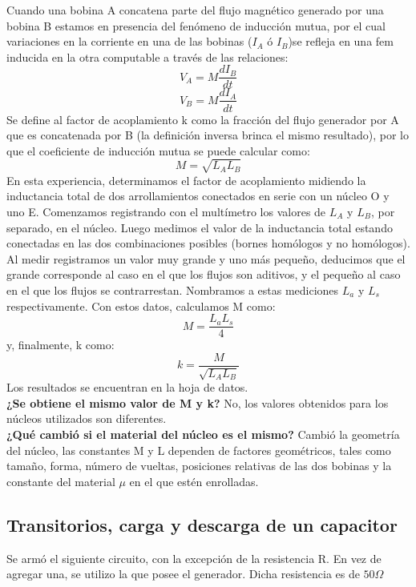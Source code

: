 \documentclass{article}
\begin{document}
Cuando una bobina A concatena parte del flujo magnético generado por una bobina B estamos en presencia del fenómeno de inducción mutua, por el cual variaciones en la corriente en una de las bobinas ($I_A$ ó $I_B$)se refleja en una fem inducida en la otra computable a través de las relaciones:
\begin{equation}
V_A = M \frac{dI_B}{dt} 
\end{equation}
\begin{equation}
V_B = M \frac{dI_A}{dt} 
\end{equation}
Se define al factor de acoplamiento k como la fracción del flujo generador por A que es concatenada por B (la definición inversa brinca el mismo resultado), por lo que el coeficiente de inducción mutua se puede calcular como:
\begin{equation}
M = \sqrt{L_A L_B}
\end{equation}
En esta experiencia, determinamos el factor de acoplamiento midiendo la inductancia total de dos arrollamientos conectados en serie con un núcleo O y uno E.
Comenzamos registrando con el multímetro los valores de $L_A$ y $L_B$, por separado, en el núcleo. Luego medimos el valor de la inductancia total estando conectadas en las dos combinaciones posibles (bornes homólogos y no homólogos). Al medir registramos un valor muy grande y uno más pequeño, deducimos que el grande corresponde al caso en el que los flujos son aditivos, y el pequeño al caso en el que los flujos se contrarrestan. Nombramos a estas mediciones $L_a$ y $L_s$ respectivamente.
Con estos datos, calculamos M como:
\begin{equation}
M = \frac{L_a L_s}{4} 
\end{equation}
y, finalmente, k como:
\begin{equation}
k = \frac{M}{\sqrt{L_A L_B}}
\end{equation}
Los resultados se encuentran en la hoja de datos.\\

\textbf{¿Se obtiene el mismo valor de M y k?} No, los valores obtenidos para los núcleos utilizados son diferentes.\\

\textbf{¿Qué cambió si el material del núcleo es el mismo?} Cambió la geometría del núcleo, las constantes M y L dependen de factores geométricos, tales como tamaño, forma, número de vueltas, posiciones relativas de las dos bobinas y la constante del material $\mu$ en el que estén enrolladas.

\subsection{Transitorios, carga y descarga de un capacitor}
Se armó el siguiente circuito, con la excepción de la resistencia R. En vez de agregar una, se utilizo la que posee el generador. Dicha resistencia es de $50 \Omega$
\end{document}
